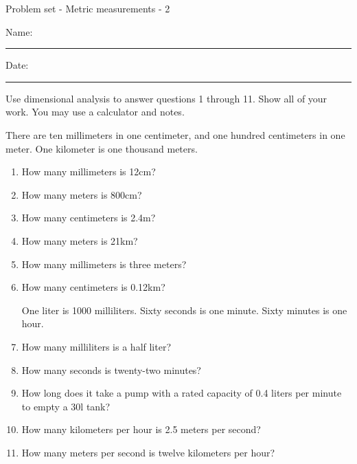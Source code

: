\documentclass[12pt]{article}
\begin{document}
\pagestyle{empty} %
\begin{center}
          Problem set - Metric measurements - 2\\[0.5in]
\end{center}
Name: \rule{4in}{0.005in} Date: \rule{1.5in}{0.005in} 
  \vspace{0.25in}

Use dimensional analysis to answer questions 1 through 11. Show all of your work. You may use a calculator and notes. 

There are ten millimeters in one centimeter, and one hundred centimeters in one meter. One kilometer is one thousand meters. 

\newcommand{\spacing}{\vspace{0.70in}}
\begin{enumerate}
\item How many millimeters is 12cm?  
\spacing

\item How many meters is 800cm? 
\spacing

\item How many centimeters is 2.4m? 
\spacing

\item How many meters is 21km?  
\spacing

\item How many millimeters is three meters? 
\spacing

\item How many centimeters is 0.12km? 
\spacing

\pagebreak

One liter is 1000 milliliters. Sixty seconds is one minute. Sixty minutes is one hour. 

\item How many milliliters is a half liter? 
\spacing

\item How many seconds is twenty-two minutes? 
\spacing

\item How long does it take a pump with a rated capacity of 0.4 liters per minute to empty a 30l tank? 
\spacing

\item How many kilometers per hour is 2.5 meters per second? 
\spacing

\item How many meters per second is twelve kilometers per hour? 
\spacing


\end{enumerate}
\end{document}
